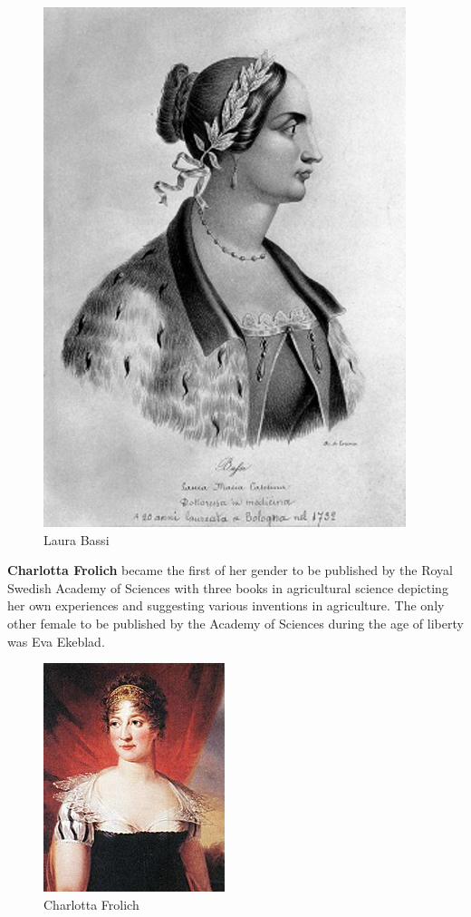 \documentclass[a4paper,10pt]{article}
\begin{document}
\begin{center}
\begin{figure}[h]
\centering
 \includegraphics[scale=1.0]{laura.png}
 \caption{Laura Bassi}
\end{figure}
\end{center}

\newblock
\textbf{Charlotta Frolich} became the first of her gender to be published by the Royal Swedish Academy of Sciences with three books in agricultural science depicting her own experiences and suggesting various inventions in agriculture. The only other female to be published by the Academy of Sciences during the age of liberty was Eva Ekeblad\cite{frolich}.

\begin{center}
\begin{figure}[h]
\centering
 \includegraphics[scale=0.7]{charlotta.jpg}
 \caption{Charlotta Frolich}
\end{figure}
\end{center}
\end{document}
